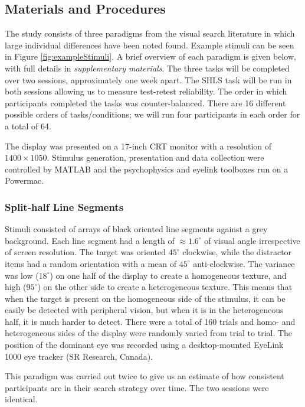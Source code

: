 \documentclass[]{rsos}%
\begin{document}
\subsection{Materials and Procedures}

The study consists of three paradigms from the visual search literature in which large individual differences have been noted found\cite{nowakowska2017, irons-leber2016, kristjansson2014}. Example stimuli can be seen in Figure \ref{fig:exampleStimuli}. A brief overview of each paradigm is given below, with full details in \textit{supplementary materials}. The three tasks will be completed over two sessions, approximately one week apart. The SHLS task will be run in both sessions allowing us to measure test-retest reliability. The order in which participants completed the tasks was counter-balanced. There are 16 different possible orders of tasks/conditions; we will run four participants in each order for a total of 64.

The display was presented on a 17-inch CRT monitor with a resolution of $1400 \times 1050$. Stimulus generation, presentation and data collection were controlled by MATLAB and the psychophysics and eyelink toolboxes \cite{brainard1997,cornelissen2002} run on a Powermac. 

\subsubsection{Split-half Line Segments}

Stimuli consisted of arrays of black oriented line segments against a grey background. Each line segment had a length of $\approx$$1.6^{\circ}$ of visual angle irrespective of screen resolution. The target was oriented $45^{\circ}$ clockwise, while the distractor items had a random orientation with a mean of $45^{\circ}$ anti-clockwise. The variance was low ($18^{\circ}$) on one half of the display to create a homogeneous texture, and high ($95^{\circ}$) on the other side to create a heterogeneous texture. This means that when the target is present on the homogeneous side of the stimulus, it can be easily be detected with peripheral vision, but when it is in the heterogeneous half, it is much harder to detect. There were a total of 160 trials and homo- and heterogeneous sides of the display were randomly varied from trial to trial. The position of the dominant eye was recorded using a desktop-mounted EyeLink 1000 eye tracker (SR Research, Canada). 

This paradigm was carried out twice to give us an estimate of how consistent participants are in their search strategy over time. The two sessions were identical.
\end{document}
